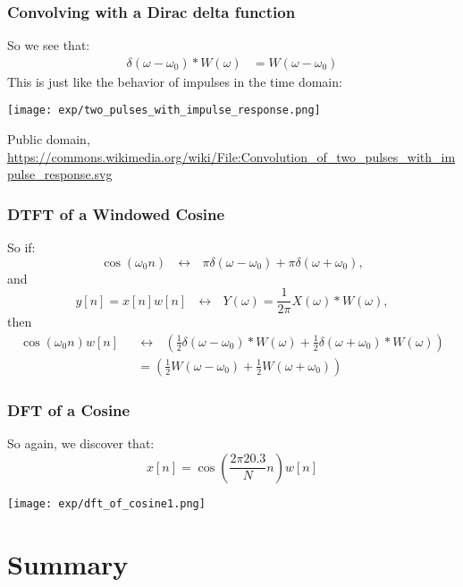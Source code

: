 \documentclass{beamer}
\begin{document}
\begin{frame}
  \frametitle{Convolving with a Dirac delta function}

  So we see that:
  \begin{align*}
    \delta(\omega-\omega_0)\ast W(\omega)
    &= W(\omega-\omega_0)
  \end{align*}
  This is just like the behavior of impulses in the time domain:
  \begin{center}
    \texttt{[image: exp/two\_pulses\_with\_impulse\_response.png]}

    {\tiny Public domain, \url{https://commons.wikimedia.org/wiki/File:Convolution_of_two_pulses_with_impulse_response.svg}}
  \end{center}
\end{frame}

\begin{frame}
  \frametitle{DTFT of a Windowed Cosine}

  So if:
  \begin{displaymath}
    \cos(\omega_0 n)~~~\leftrightarrow~~~\pi\delta(\omega-\omega_0) + \pi\delta(\omega+\omega_0),
  \end{displaymath}
  and
  \begin{displaymath}
    y[n]=x[n]w[n] ~~~\leftrightarrow~~~Y(\omega) = \frac{1}{2\pi} X(\omega)\ast W(\omega),
  \end{displaymath}
  then
  \begin{align*}
    \cos(\omega_0 n)w[n] ~~~
    &\leftrightarrow~~~
    \left(\frac{1}{2}\delta(\omega-\omega_0)\ast W(\omega)+
    \frac{1}{2}\delta(\omega+\omega_0)\ast W(\omega)\right)\\
    &= \left(\frac{1}{2}W(\omega-\omega_0)+
    \frac{1}{2}W(\omega+\omega_0)\right)
  \end{align*}
\end{frame}  
  
\begin{frame}
  \frametitle{DFT of a Cosine}

  So again, we discover that:
  \[
  x[n] = \cos\left(\frac{2\pi 20.3}{N}n\right) w[n]
  \]
  
  \centerline{\texttt{[image: exp/dft\_of\_cosine1.png]}}
\end{frame}

\section[Summary]{Summary}
\setcounter{subsection}{1}
\end{document}
